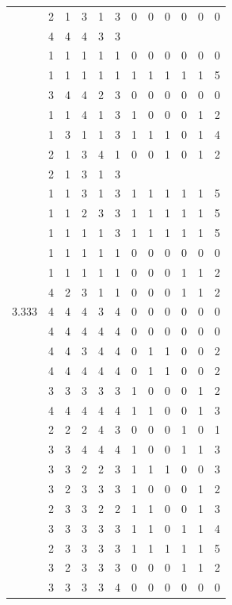 \documentclass[]{book}
\theoremstyle{definition}
\theoremstyle{definition}
\theoremstyle{definition}
\theoremstyle{remark}
\begin{document}
\begin{table}
{\begin{tabular}[t]{rrrrrrrrrrrr}
 & 2 & 1 & 3 & 1 & 3 & 0 & 0 & 0 & 0 & 0 & 0\\
 & 4 & 4 & 4 & 3 & 3 &  &  &  &  &  & \\
 & 1 & 1 & 1 & 1 & 1 & 0 & 0 & 0 & 0 & 0 & 0\\
 & 1 & 1 & 1 & 1 & 1 & 1 & 1 & 1 & 1 & 1 & 5\\
 & 3 & 4 & 4 & 2 & 3 & 0 & 0 & 0 & 0 & 0 & 0\\
 & 1 & 1 & 4 & 1 & 3 & 1 & 0 & 0 & 0 & 1 & 2\\
 & 1 & 3 & 1 & 1 & 3 & 1 & 1 & 1 & 0 & 1 & 4\\
 & 2 & 1 & 3 & 4 & 1 & 0 & 0 & 1 & 0 & 1 & 2\\
 & 2 & 1 & 3 & 1 & 3 &  &  &  &  &  & \\
 & 1 & 1 & 3 & 1 & 3 & 1 & 1 & 1 & 1 & 1 & 5\\
 & 1 & 1 & 2 & 3 & 3 & 1 & 1 & 1 & 1 & 1 & 5\\
 & 1 & 1 & 1 & 1 & 3 & 1 & 1 & 1 & 1 & 1 & 5\\
 & 1 & 1 & 1 & 1 & 1 & 0 & 0 & 0 & 0 & 0 & 0\\
 & 1 & 1 & 1 & 1 & 1 & 0 & 0 & 0 & 1 & 1 & 2\\
 & 4 & 2 & 3 & 1 & 1 & 0 & 0 & 0 & 1 & 1 & 2\\
3.333 & 4 & 4 & 4 & 3 & 4 & 0 & 0 & 0 & 0 & 0 & 0\\
 & 4 & 4 & 4 & 4 & 4 & 0 & 0 & 0 & 0 & 0 & 0\\
 & 4 & 4 & 3 & 4 & 4 & 0 & 1 & 1 & 0 & 0 & 2\\
 & 4 & 4 & 4 & 4 & 4 & 0 & 1 & 1 & 0 & 0 & 2\\
 & 3 & 3 & 3 & 3 & 3 & 1 & 0 & 0 & 0 & 1 & 2\\
 & 4 & 4 & 4 & 4 & 4 & 1 & 1 & 0 & 0 & 1 & 3\\
 & 2 & 2 & 2 & 4 & 3 & 0 & 0 & 0 & 1 & 0 & 1\\
 & 3 & 3 & 4 & 4 & 4 & 1 & 0 & 0 & 1 & 1 & 3\\
 & 3 & 3 & 2 & 2 & 3 & 1 & 1 & 1 & 0 & 0 & 3\\
 & 3 & 2 & 3 & 3 & 3 & 1 & 0 & 0 & 0 & 1 & 2\\
 & 2 & 3 & 3 & 2 & 2 & 1 & 1 & 0 & 0 & 1 & 3\\
 & 3 & 3 & 3 & 3 & 3 & 1 & 1 & 0 & 1 & 1 & 4\\
 & 2 & 3 & 3 & 3 & 3 & 1 & 1 & 1 & 1 & 1 & 5\\
 & 3 & 2 & 3 & 3 & 3 & 0 & 0 & 0 & 1 & 1 & 2\\
 & 3 & 3 & 3 & 3 & 4 & 0 & 0 & 0 & 0 & 0 & 0\\

\end{tabular}}
\end{table}
\end{document}
